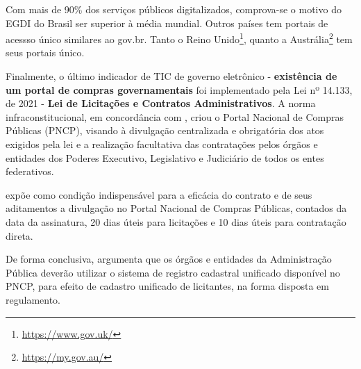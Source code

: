 Com mais de 90\% dos serviços públicos digitalizados, comprova-se o motivo do EGDI do Brasil ser superior à média mundial. Outros países tem portais de acessso único similares ao gov.br. Tanto o Reino Unido\footnote{\url{https://www.gov.uk/}}, quanto a Austrália\footnote{\url{https://my.gov.au/}} tem seus portais único.

Finalmente, o último indicador de TIC de governo eletrônico - \textbf{existência de um portal de compras governamentais} foi implementado pela Lei nº 14.133, de 2021 - \textbf{Lei de Licitações e Contratos Administrativos}. A norma infraconstitucional, em concordância com \cite{l14133}, criou o Portal Nacional de Compras Públicas (PNCP), visando à divulgação centralizada e obrigatória dos atos exigidos pela lei e a realização facultativa das contratações pelos órgãos e entidades dos Poderes Executivo, Legislativo e Judiciário de todos os entes federativos.

\cite{l14133} expõe como condição indispensável para a eficácia do contrato e de seus aditamentos a divulgação no Portal Nacional de Compras Públicas, contados da data da assinatura, 20 dias úteis para licitações e 10 dias úteis para contratação direta.

De forma conclusiva, \cite{l14133} argumenta que os órgãos e entidades da Administração Pública deverão utilizar o sistema de registro cadastral unificado disponível no PNCP, para efeito de cadastro unificado de licitantes, na forma disposta em regulamento.